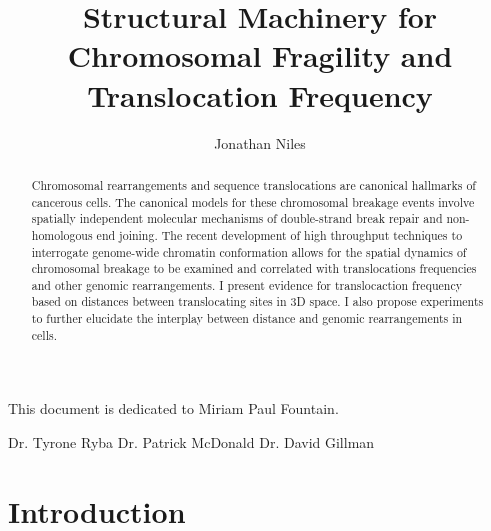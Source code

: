 \documentclass[phd,tocprelim]{cornell}
\title {Structural Machinery for Chromosomal Fragility and Translocation Frequency}
\author {Jonathan Niles}
\begin{document}
\maketitle
\makecopyright

\begin{abstract}
Chromosomal rearrangements and sequence translocations are
canonical hallmarks of cancerous cells.  The canonical models
for these chromosomal breakage events involve spatially
independent molecular mechanisms of double-strand break
repair and non-homologous end joining.  The recent development of high
throughput techniques to interrogate genome-wide chromatin
conformation allows for the spatial dynamics of chromosomal
breakage to be examined and correlated with translocations
frequencies and other genomic rearrangements.  I present
evidence for translocaction frequency based on distances between
translocating sites in 3D space.  I also propose experiments
to further elucidate the interplay between distance and
genomic rearrangements in cells.
\end{abstract}

\begin{dedication}
This document is dedicated to Miriam Paul Fountain.
\end{dedication}

\begin{acknowledgements}
Dr. Tyrone Ryba
Dr. Patrick McDonald
Dr. David Gillman
\end{acknowledgements}

\contentspage
\tablelistpage
\figurelistpage

\normalspacing \setcounter{page}{1} 
\pagestyle{cornell} \addtolength{\parskip}{0.5\baselineskip}

\chapter{Introduction}


\end{document}
